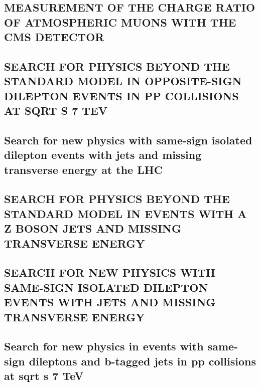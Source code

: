\documentclass[a4paper, 11pt, twoside, openright]{report}
\begin{document}
\subsection{MEASUREMENT OF THE CHARGE RATIO OF ATMOSPHERIC MUONS WITH THE CMS DETECTOR}


\subsection{SEARCH FOR PHYSICS BEYOND THE STANDARD MODEL IN OPPOSITE-SIGN DILEPTON EVENTS IN PP COLLISIONS AT SQRT S 7 TEV}


\subsection{Search for new physics with same-sign isolated dilepton events with jets and missing transverse energy at the LHC}


\subsection{SEARCH FOR PHYSICS BEYOND THE STANDARD MODEL IN EVENTS WITH A Z BOSON JETS AND MISSING TRANSVERSE ENERGY}


\subsection{SEARCH FOR NEW PHYSICS WITH SAME-SIGN ISOLATED DILEPTON EVENTS WITH JETS AND MISSING TRANSVERSE ENERGY}


\subsection{Search for new physics in events with same-sign dileptons and b-tagged jets in pp collisions at sqrt s 7 TeV}

\end{document}
